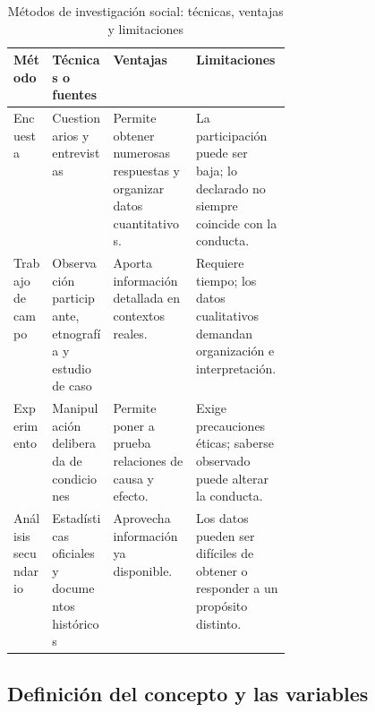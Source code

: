 \begin{table}[H]
\begin{minipage}{\linewidth}
\caption{Métodos de investigación social: técnicas, ventajas y limitaciones}\label{tab:tarea6-1}
\begin{singlespace}
\small\setlength{\tabcolsep}{4pt}
\setlength{\RaggedRightParindent}{0pt}\setlength{\parindent}{0pt}
\renewcommand{\arraystretch}{1.25}
\begin{tabularx}{\linewidth}{@{}>{\RaggedRight\arraybackslash}p{0.14\linewidth}>{\RaggedRight\arraybackslash}p{0.22\linewidth}ZZ@{}}
\toprule
\textbf{Método} & \textbf{Técnicas o fuentes} & \textbf{Ventajas} & \textbf{Limitaciones} \\
\midrule
Encuesta & Cuestionarios y entrevistas & Permite obtener numerosas respuestas y organizar datos cuantitativos. & La participación puede ser baja; lo declarado no siempre coincide con la conducta. \\
Trabajo de campo & Observación participante, etnografía y estudio de caso & Aporta información detallada en contextos reales. & Requiere tiempo; los datos cualitativos demandan organización e interpretación. \\
Experimento & Manipulación deliberada de condiciones & Permite poner a prueba relaciones de causa y efecto. & Exige precauciones éticas; saberse observado puede alterar la conducta. \\
Análisis secundario & Estadísticas oficiales y documentos históricos & Aprovecha información ya disponible. & Los datos pueden ser difíciles de obtener o responder a un propósito distinto. \\
\bottomrule
\end{tabularx}
\end{singlespace}
\end{minipage}
\end{table}

\subsection{Definición del concepto y las variables}

